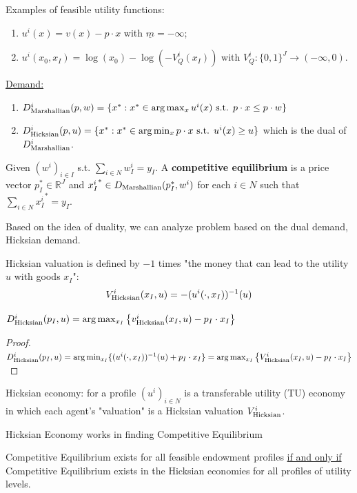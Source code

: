 \documentclass[11pt]{elegantbook}
\begin{document}
\begin{example}
    Examples of feasible utility functions:
    \begin{enumerate}
        \item $u^i(x)=v(x)-p\cdot x$ with $\underline{m}=-\infty$;
        \item $u^i(x_0,x_I)=\log(x_0)-\log(-V_Q^i(x_I))$ with $V_Q^i:\{0,1\}^J \rightarrow (-\infty,0)$.
    \end{enumerate}
\end{example}

\underline{Demand:}
\begin{enumerate}[$\circ$]
    \item $D_\textnormal{Marshallian}^i(p,w)=\{x^*:x^*\in\arg\max_{x} u^i(x) \textnormal{ s.t. }p\cdot x\leq p\cdot w\}$
    \item $D_\textnormal{Hicksian}^i(p,u)=\{x^*:x^*\in\arg\min_{x} p\cdot x \textnormal{ s.t. }u^i(x)\geq u\}$ which is the dual of $D_\textnormal{Marshallian}^i$.
\end{enumerate}
\begin{definition}
    \normalfont
    Given $(w^i)_{i\in I}$ s.t. $\sum_{i\in N}w_I^i=y_I$. A \textbf{competitive equilibrium} is a price vector $p_I^*\in \mathbb{R}^J$ and ${x_I^i}^*\in D_\textnormal{Marshallian}(p_I^*,w^i)$ for each $i\in N$ such that $\sum_{i\in N}{x_I^i}^*=y_I$.
\end{definition}

Based on the idea of duality, we can analyze problem based on the dual demand, Hicksian demand.
\begin{definition}
    \normalfont
    Hicksian valuation is defined by $-1$ times "the money that can lead to the utility $u$ with goods $x_I$": $$V_\textnormal{Hicksian}^i(x_I,u)=-(u^i(\cdot,x_I))^{-1}(u)$$
\end{definition}


\begin{proposition}
    $D_\textnormal{Hicksian}^i(p_I,u)=\arg\max_{x_I}\left\{v_\textnormal{Hicksian}^i(x_I,u)-p_I\cdot x_I\right\}$
\end{proposition}
\begin{proof}
    $D_\textnormal{Hicksian}^i(p_I,u)=\arg\min_{x_I}\{(u^i(\cdot,x_I))^{-1}(u)+p_I\cdot x_I\}=\arg\max_{x_I}\left\{V_\textnormal{Hicksian}^i(x_I,u)-p_I\cdot x_I\right\}$
\end{proof}


\begin{definition}
    \normalfont
    Hicksian economy: for a profile $(u^i)_{i\in N}$ is a transferable utility (TU) economy in which each agent's "valuation" is a Hicksian valuation $V_\textnormal{Hicksian}^i$.
\end{definition}
Hicksian Economy works in finding Competitive Equilibrium
\begin{theorem}\label{EED}
    Competitive Equilibrium exists for all feasible endowment profiles \underline{if and only if} Competitive Equilibrium exists in the Hicksian economies for all profiles of utility levels.
\end{theorem}
\end{document}
